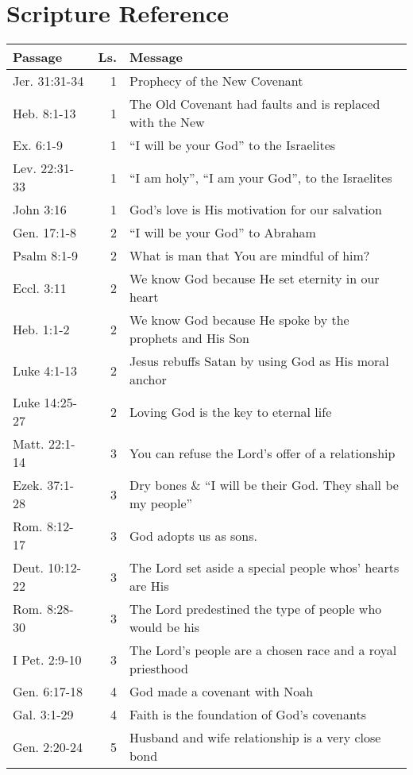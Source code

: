 \chapter{Scripture Reference}

\begin{table}[h]%
\centering
\begin{tabular}{lrp{11cm}}
\toprule
Passage & Ls. & Message \\
\midrule
Jer. 31:31-34   & 1  & Prophecy of the New Covenant\\
Heb. 8:1-13     & 1  &  The Old Covenant had faults and is replaced with the New\\
Ex. 6:1-9       & 1  & ``I will be your God'' to the Israelites\\
Lev. 22:31-33   & 1  & ``I am holy'', ``I am your God'', to the Israelites\\
John 3:16       & 1  & God's love is His motivation for our salvation\\
Gen. 17:1-8     & 2  & ``I will be your God'' to Abraham\\
Psalm 8:1-9     & 2  & What is man that You are mindful of him?\\
Eccl. 3:11      & 2  & We know God because He set eternity in our heart\\
Heb. 1:1-2      & 2  & We know God because He spoke by the prophets and His Son\\
Luke 4:1-13     & 2  & Jesus rebuffs Satan by using God as His moral anchor\\
Luke 14:25-27   & 2  & Loving God is the key to eternal life\\
Matt. 22:1-14   & 3  & You can refuse the Lord's offer of a relationship\\
Ezek. 37:1-28   & 3  & Dry bones \& ``I will be their God.  They shall be my people''\\
Rom. 8:12-17    & 3  & God adopts us as sons.\\
Deut. 10:12-22  & 3  & The Lord set aside a special people whos' hearts are His\\
Rom. 8:28-30    & 3  & The Lord predestined the type of people who would be his\\
I Pet. 2:9-10   & 3  & The Lord's people are a chosen race and a royal priesthood\\
Gen. 6:17-18    & 4  & God made a covenant with Noah \\
Gal. 3:1-29     & 4  & Faith is the foundation of God's covenants\\
Gen. 2:20-24    & 5  & Husband and wife relationship is a very close bond\\

\end{tabular}
\end{table}
